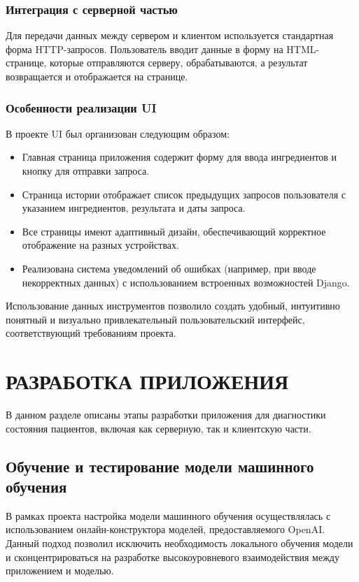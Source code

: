 {\subsubsection*{Интеграция с серверной частью}
Для передачи данных между сервером и клиентом используется стандартная форма HTTP-запросов. Пользователь вводит данные в форму на HTML-странице, которые отправляются серверу, обрабатываются, а результат возвращается и отображается на странице.

\subsubsection*{Особенности реализации UI}
В проекте UI был организован следующим образом:
\begin{itemize}
    \item Главная страница приложения содержит форму для ввода ингредиентов и кнопку для отправки запроса.
    \item Страница истории отображает список предыдущих запросов пользователя с указанием ингредиентов, результата и даты запроса.
    \item Все страницы имеют адаптивный дизайн, обеспечивающий корректное отображение на разных устройствах.
    \item Реализована система уведомлений об ошибках (например, при вводе некорректных данных) с использованием встроенных возможностей Django.
\end{itemize}

Использование данных инструментов позволило создать удобный, интуитивно понятный и визуально привлекательный пользовательский интерфейс, соответствующий требованиям проекта.

\newpage

\section{\MakeUppercase{Разработка приложения}}
В данном разделе описаны этапы разработки приложения для диагностики состояния пациентов, включая как серверную, так и клиентскую части.

\subsection{Обучение и тестирование модели машинного обучения}
{
    В рамках проекта настройка модели машинного обучения осуществлялась с использованием онлайн-конструктора моделей, предоставляемого OpenAI. Данный подход позволил исключить необходимость локального обучения модели и сконцентрироваться на разработке высокоуровневого взаимодействия между приложением и моделью.

}}
